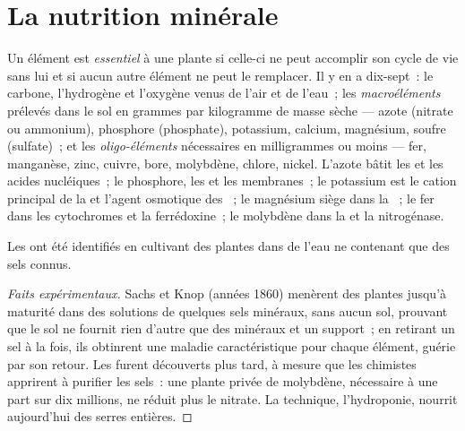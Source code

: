 \section{La nutrition minérale}

\begin{definition}\label{def:b1:plant-water-minerals:elements}
Un élément est \emph{essentiel} à une plante si celle-ci ne peut
accomplir son cycle de vie sans lui et si aucun autre élément ne peut
le remplacer. Il y en a dix-sept~: le carbone, l'hydrogène et l'oxygène
venus de l'air et de l'eau~; les \emph{macroéléments} prélevés dans le
sol en grammes par kilogramme de masse sèche --- azote (nitrate ou
ammonium), phosphore (phosphate), potassium, calcium, magnésium,
soufre (sulfate)~; et les \emph{oligo-éléments} nécessaires en
milligrammes ou moins --- fer, manganèse, zinc, cuivre, bore,
molybdène, chlore, nickel. L'azote bâtit les  et les acides
nucléiques~; le phosphore, les  et les membranes~; le
potassium est le cation principal de la  et l'agent osmotique
des ~; le magnésium siège dans la ~; le fer dans les
cytochromes et la ferrédoxine~; le molybdène dans la 
et la nitrogénase.
\end{definition}

\begin{proposition}\label{prop:b1:plant-water-minerals:hydroponics}
Les  ont été identifiés en cultivant des plantes
dans de l'eau ne contenant que des sels connus.
\end{proposition}
\begin{proof}[Faits expérimentaux]
Sachs et Knop (années 1860) menèrent des plantes jusqu'à maturité dans
des solutions de quelques sels minéraux, sans aucun sol, prouvant que
le sol ne fournit rien d'autre que des minéraux et un support~; en
retirant un sel à la fois, ils obtinrent une maladie caractéristique
pour chaque élément, guérie par son retour. Les  furent
découverts plus tard, à mesure que les chimistes apprirent à purifier
les sels~: une plante privée de molybdène, nécessaire à une part sur
dix millions, ne réduit plus le nitrate. La technique, l'hydroponie,
nourrit aujourd'hui des serres entières.
\end{proof}

